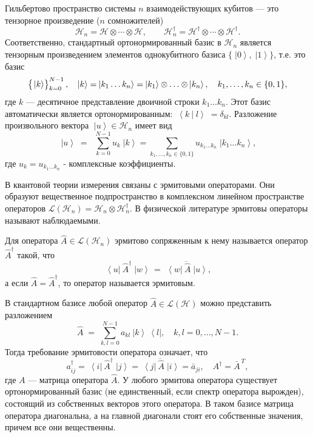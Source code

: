 \documentclass[a4paper]{report}
\newcommand{\ket}[1] {\!\!\;\ensuremath{\left|#1\right\rangle}}
\newcommand{\bra}[1] {\!\!\:\ensuremath{\left\langle#1\right|\!\!\:}}
\newcommand{\ketbra}[2]{\!\!\:\ensuremath {\left|#1\right\rangle\!\:\!\!\left\langle#2\right|}}
\newcommand{\braket}[2]{\ensuremath {\!\!\:\left\langle#1\!\!\: \left|\!\!\!\;\right.#2\right\rangle\!\!\;}}
\begin{document}
Гильбертово пространство системы $n$ взаимодействующих кубитов --- это тензорное произведение ($n$ сомножителей)
\begin{equation*}
\mathcal{H}_n= \mathcal{H}\otimes\cdots\otimes\mathcal{H},\qquad \mathcal{H}_n^\dag= \mathcal{H}^\dag\otimes\cdots\otimes \mathcal{H}^\dag.
\end{equation*}
Соответственно, стандартный ортонормированный базис в $\mathcal{H}_n$ является тензорным произведением элементов однокубитного базиса $\{\ket{0},\ket{1}\}$, т.е. это базис
\begin{equation*}
\left\{\vphantom{A^k_k}\ket{k}\right\}_{k=0}^{N-1},\quad \ket{k}= \ket{k_1\ldots k_n}= \ket{k_1}\otimes\ldots\otimes \ket{k_n},\quad k_1,\ldots,k_n\in\{0,1\},
\end{equation*}
где $k$ --- десятичное представление двоичной строки $k_1\ldots k_n$. Этот базис автоматически является ортонормированным: $\braket{k}{l}=\delta_{kl}$. Разложение произвольного вектора $\ket{u}\in\mathcal{H}_n$ имеет вид
\begin{equation}\label{}
\ket{u}\;=\;\; \sum\limits_{k=0}^{N-1} u_{k}\ket{k}= \sum\limits_{k_1,\ldots,k_n\in\{0,1\}} u_{k_1\ldots k_n}\ket{k_1\ldots k_n},
\nonumber
\end{equation}
где ${u_{k}= u_{k_1\ldots k_n}}$ - комплексные коэффициенты.

В квантовой теории измерения связаны с эрмитовыми операторами. Они образуют вещественное подпространство в комплексном линейном пространстве операторов $\mathcal{L}(\mathcal{H}_n)= \mathcal{H}_n\otimes\mathcal{H}_n^\dag$. В физической литературе эрмитовы операторы называют наблюдаемыми.

Для оператора ${\hat{A}\in\mathcal{L}(\mathcal{H}_n)}$ эрмитово сопряженным к нему называется оператор ${\hat{A}^\dag}$ такой, что
\begin{equation}\label{}
\bra{u}\hat{A}^\dag\ket{w}\,=\, \overline{\bra{w}\hat{A}\ket{u}},
\nonumber
\end{equation}
а если ${\hat{A}=\hat{A}^\dag}$, то оператор называется эрмитовым.

В стандартном базисе любой оператор $\hat{A}\in \mathcal{L}(\mathcal{H})$ можно представить разложением
\begin{equation}\label{}
\hat{A}\;=\; \sum\limits_{k,l=0}^{N-1}a_{kl}\ketbra{k}{l},\quad k,l=0,\ldots,N\!-\!1.
\nonumber
\end{equation}
Тогда требование эрмитовости оператора означает, что
\begin{equation}\label{}
a^\dag_{ij}= \bra{i}\hat{A}^\dag\ket{j}= \overline{\bra{j}\hat{A}\ket{i}}= \bar{a}_{ji}, \quad A^\dag=\bar{A}^{\:\!T},
\nonumber
\end{equation}
где $A$ --- матрица оператора $\hat{A}$. У любого эрмитова оператора существует ортонормированный базис (не единственный, если спектр оператора вырожден), состоящий из собственных векторов этого оператора. В таком базисе матрица оператора диагональна, а на главной диагонали стоят его собственные значения, причем все они вещественны.
\end{document}

